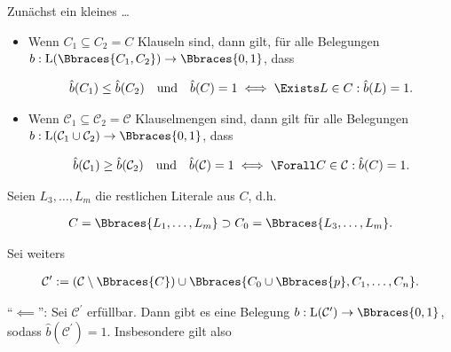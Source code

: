 \begin{solution}

Zunächst ein kleines \dots

\begin{lemma*}

    \phantom{}

    \begin{itemize}

        \item Wenn $C_1 \subseteq C_2 = C$ Klauseln sind, dann gilt, für alle Belegungen $b: \operatorname L(\Bbraces{C_1, C_2}) \to \Bbraces{0, 1}$, dass

        \begin{align*}
            \hat b(C_1) \leq \hat b(C_2)
            \quad
            \text{und}
            \quad
            \hat b(C) = 1
            \iff
            \Exists L \in C:
                \hat b(L) = 1.
        \end{align*}

        \item Wenn $\mathcal C_1 \subseteq \mathcal C_2 = \mathcal C$ Klauselmengen sind, dann gilt für alle Belegungen $b: \operatorname L(\mathcal C_1 \cup \mathcal C_2) \to \Bbraces{0, 1}$, dass

        \begin{align*}
            \hat b(\mathcal C_1) \geq \hat b(\mathcal C_2)
            \quad
            \text{und}
            \quad
            \hat b(\mathcal C) = 1
            \iff
            \Forall C \in \mathcal C:
                \hat b(C) = 1.
        \end{align*}

    \end{itemize}

\end{lemma*}

Seien $L_3, \dots, L_m$ die restlichen Literale aus $C$, d.h.

\begin{align*}
    C = \Bbraces{L_1, \dots, L_m}
    \supset
    C_0 = \Bbraces{L_3, \dots, L_m}.
\end{align*}

Sei weiters

\begin{align*}
    \mathcal C^\prime
    :=
    (\mathcal C \setminus \Bbraces{C})
    \cup
    \Bbraces{C_0 \cup \Bbraces{p}, C_1, \dots, C_n}.
\end{align*}

\enquote{$\impliedby$}:
Sei $\mathcal C^\prime$ erfüllbar.
Dann gibt es eine Belegung $b: \operatorname L(\mathcal C^\prime) \to \Bbraces{0, 1}$, sodass $\hat b(\mathcal C^\prime) = 1$.
Insbesondere gilt also


\end{solution}
